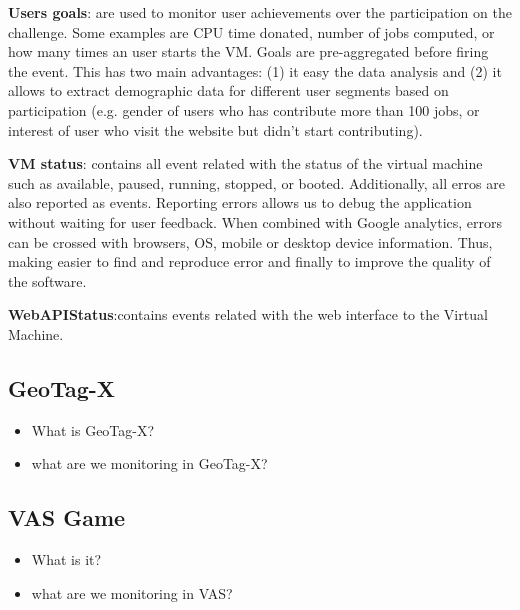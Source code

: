 \documentclass{article}
\begin{document}
\textbf{Users goals}: are used to monitor user achievements over the participation on the challenge. Some examples are CPU time donated, number of jobs computed, or how many times an user starts the VM. Goals are pre-aggregated before firing the event. This has two main advantages: (1) it easy the data analysis and (2) it allows to extract demographic data for different user segments based on participation (e.g. gender of users who has contribute more than 100 jobs, or interest of user who visit the website but didn't start contributing). 

\textbf{VM status}: contains all event related with the status of the virtual machine such as available, paused, running, stopped, or booted. Additionally, all erros are also reported as events. Reporting errors allows us to debug the application without waiting for user feedback. When combined with Google analytics, errors can be crossed with browsers, OS, mobile or desktop device information. Thus, making easier to find and reproduce error and finally to improve the quality of the software. 

\textbf{WebAPIStatus}:contains events related with the web interface to the Virtual Machine.



\subsection{GeoTag-X}
\begin{itemize}
\item What is GeoTag-X?
\item what are we monitoring in GeoTag-X?
\end{itemize}


\subsection{VAS Game}
\begin{itemize}
\item What is it?
\item what are we monitoring in VAS?
\end{itemize}
\end{document}
